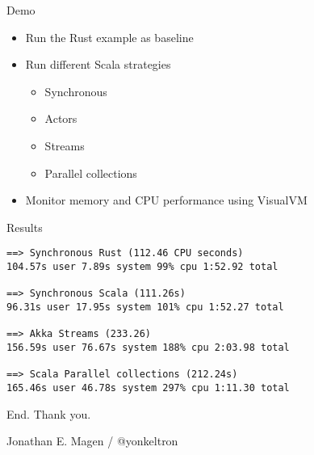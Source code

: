 \documentclass[aspectratio=169]{beamer}
\newcommand{\megatext}[1]{
  \begin{center}
    \Huge
    #1
  \end{center}
}
\begin{document}
\begin{frame}
  \megatext{Demo}

  \begin{itemize}
  \item Run the Rust example as baseline
  \item Run different Scala strategies
    \begin{itemize}
    \item Synchronous
    \item Actors
    \item Streams
    \item Parallel collections
    \end{itemize}
  \item Monitor memory and CPU performance using VisualVM
  \end{itemize}
\end{frame}

\begin{frame}[fragile]{Results}
  \begin{verbatim}
==> Synchronous Rust (112.46 CPU seconds)
104.57s user 7.89s system 99% cpu 1:52.92 total

==> Synchronous Scala (111.26s)
96.31s user 17.95s system 101% cpu 1:52.27 total

==> Akka Streams (233.26)
156.59s user 76.67s system 188% cpu 2:03.98 total

==> Scala Parallel collections (212.24s)
165.46s user 46.78s system 297% cpu 1:11.30 total
  \end{verbatim}
\end{frame}


\begin{frame}
  \megatext{End. Thank you.}
  \Large
  \centering
  Jonathan E. Magen /  @yonkeltron
\end{frame}
\end{document}
